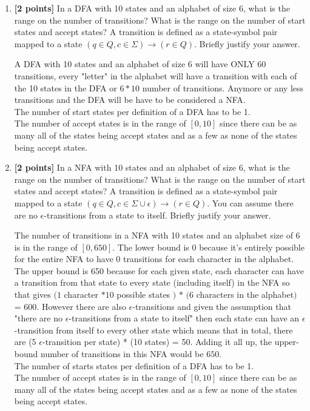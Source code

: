 \documentclass[11pt]{article}
\theoremstyle{definition}
\theoremstyle{theorem}
\newcommand{\solution}{\medskip\noindent{\color{blue}\textbf{Solution:}}}
\begin{document}
\begin{enumerate}[label=(\alph*)]

\item \textbf{[2 points]}   In a DFA with 10 states and an alphabet of size 6, what is the range on the number of transitions? What is the range on the number of start states and accept states? A transition is defined as a state-symbol pair mapped to a state $(q \in Q, c \in \Sigma) \rightarrow (r \in Q)$. Briefly justify your answer.

\solution

A DFA with 10 states and an alphabet of size 6 will have ONLY 60 transitions, every "letter" in the alphabet will have a transition with each of the 10 states in the DFA or $6 * 10$ number of transitions. Anymore or any less transitions and the DFA will be have to be considered a NFA.
\\[3ex] The number of start states per definition of a DFA has to be 1.
\\[3ex] The number of accept states is in the range of $[0, 10]$ since there can be as many all of the states being accept states and as a few as none of the states being accept states.


\item \textbf{[2 points]}    In a NFA with 10 states and an alphabet of size 6, what is the range on the number of transitions? What is the range on the number of start states and accept states? A transition is defined as a state-symbol pair mapped to a state $(q \in Q, c \in \Sigma \cup \epsilon) \rightarrow (r \in Q)$. You can assume there are no $\epsilon$-transitions from a state to itself. Briefly justify your answer.


\solution

The number of transitions in a NFA with 10 states and an alphabet size of 6 is in the range of $[0, 650]$. The lower bound is 0 because it's entirely possible for the entire NFA to have 0 transitions for each character in the alphabet.
The upper bound is 650 because for each given state, each character can have a transition from that state to every state (including itself) in the NFA so that gives $(1$ character $* 10$ possible states $)$ $*$ $(6$ characters in the alphabet$)$ = 600.
However there are also $\epsilon$-transitions and given the assumption that "there are no $\epsilon$-transitions from a state to itself" then each state can have an $\epsilon$-transition from itself to every other state which means that in total, there are (5 $\epsilon$-transition per state) * (10 states) = 50.
Adding it all up, the upper-bound number of transitions in this NFA would be $650$.
\\[3ex] The number of starts states per definition of a DFA has to be 1.
\\[3ex] The number of accept states is in the range of $[0, 10]$ since there can be as many all of the states being accept states and as a few as none of the states being accept states.


\end{enumerate}
\end{document}
